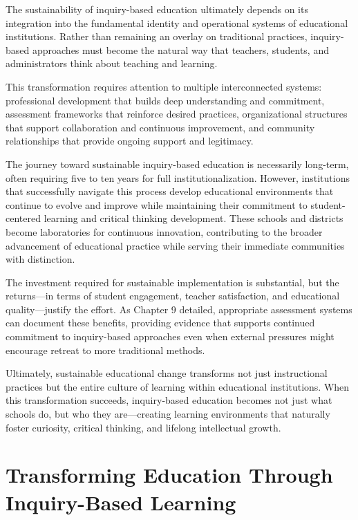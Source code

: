 \documentclass[
  Letterpaper,
]{scrbook}
\begin{document}
The sustainability of inquiry-based education ultimately depends on its
integration into the fundamental identity and operational systems of
educational institutions. Rather than remaining an overlay on
traditional practices, inquiry-based approaches must become the natural
way that teachers, students, and administrators think about teaching and
learning.

This transformation requires attention to multiple interconnected
systems: professional development that builds deep understanding and
commitment, assessment frameworks that reinforce desired practices,
organizational structures that support collaboration and continuous
improvement, and community relationships that provide ongoing support
and legitimacy.

The journey toward sustainable inquiry-based education is necessarily
long-term, often requiring five to ten years for full
institutionalization. However, institutions that successfully navigate
this process develop educational environments that continue to evolve
and improve while maintaining their commitment to student-centered
learning and critical thinking development. These schools and districts
become laboratories for continuous innovation, contributing to the
broader advancement of educational practice while serving their
immediate communities with distinction.

The investment required for sustainable implementation is substantial,
but the returns---in terms of student engagement, teacher satisfaction,
and educational quality---justify the effort. As Chapter 9 detailed,
appropriate assessment systems can document these benefits, providing
evidence that supports continued commitment to inquiry-based approaches
even when external pressures might encourage retreat to more traditional
methods.

Ultimately, sustainable educational change transforms not just
instructional practices but the entire culture of learning within
educational institutions. When this transformation succeeds,
inquiry-based education becomes not just what schools do, but who they
are---creating learning environments that naturally foster curiosity,
critical thinking, and lifelong intellectual growth.


\chapter{Transforming Education Through Inquiry-Based
Learning}\label{transforming-education-through-inquiry-based-learning}
\end{document}
